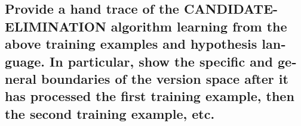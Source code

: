 \documentclass{article}
\begin{document}
\begin{latin}
		\subsection{Provide a hand trace of the CANDIDATE-ELIMINATION algorithm learning from
			the above training examples and hypothesis language. In particular, show the
			specific and general boundaries of the version space after it has processed the first
			training example, then the second training example, etc.}
			
	\end{latin}
\end{document}
